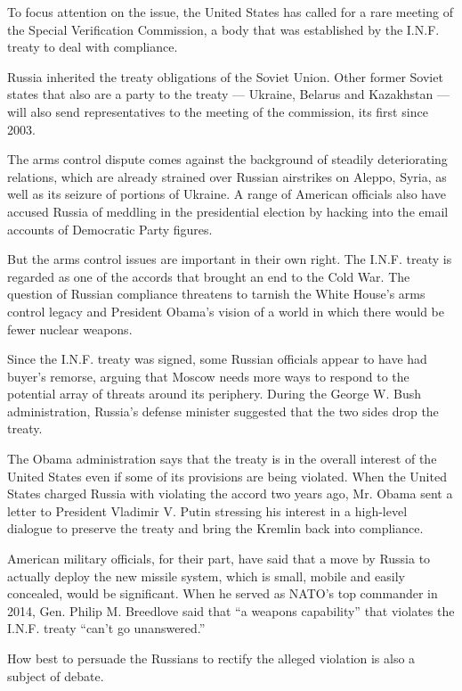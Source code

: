 To focus attention on the issue, the United States has called for a rare
meeting of the Special Verification Commission, a body that was
established by the I.N.F. treaty to deal with compliance.

Russia inherited the treaty obligations of the Soviet Union. Other
former Soviet states that also are a party to the treaty --- Ukraine,
Belarus and Kazakhstan --- will also send representatives to the meeting
of the commission, its first since 2003.

The arms control dispute comes against the background of steadily
deteriorating relations, which are already strained over Russian
airstrikes on Aleppo, Syria, as well as its seizure of portions of
Ukraine. A range of American officials also have accused Russia of
meddling in the presidential election by hacking into the email accounts
of Democratic Party figures.

But the arms control issues are important in their own right. The I.N.F.
treaty is regarded as one of the accords that brought an end to the Cold
War. The question of Russian compliance threatens to tarnish the White
House's arms control legacy and President Obama's vision of a world in
which there would be fewer nuclear weapons.

Since the I.N.F. treaty was signed, some Russian officials appear to
have had buyer's remorse, arguing that Moscow needs more ways to respond
to the potential array of threats around its periphery. During the
George W. Bush administration, Russia's defense minister suggested that
the two sides drop the treaty.

The Obama administration says that the treaty is in the overall interest
of the United States even if some of its provisions are being violated.
When the United States charged Russia with violating the accord two
years ago, Mr. Obama sent a letter to President Vladimir V. Putin
stressing his interest in a high-level dialogue to preserve the treaty
and bring the Kremlin back into compliance.

American military officials, for their part, have said that a move by
Russia to actually deploy the new missile system, which is small, mobile
and easily concealed, would be significant. When he served as NATO's top
commander in 2014, Gen. Philip M. Breedlove said that ``a weapons
capability'' that violates the I.N.F. treaty ``can't go unanswered.''

How best to persuade the Russians to rectify the alleged violation is
also a subject of debate.

